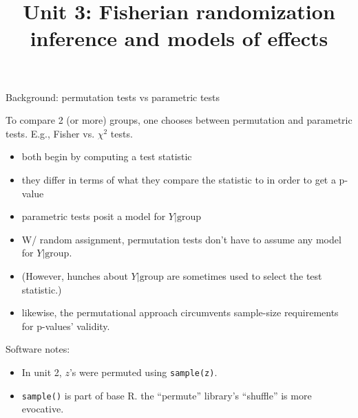 

%

%





\title[Fisherian inference]{Unit 3: Fisherian randomization inference and models of effects}




  


\begin{frame}[<+->]{Background: permutation tests vs parametric tests}

To compare 2 (or more) groups, one chooses between
permutation and parametric tests. E.g., Fisher vs. $\chi^{2}$ tests.
\begin{itemize}
\item both begin by computing a test statistic
\item they differ in terms of what they compare the statistic to in order to get a p-value
\item parametric tests posit a model for $Y| \mathrm{group}$
\item W/ random assignment, permutation tests don't have to
  assume any model for $Y| \mathrm{group}$.
\item (However, hunches about $Y| \mathrm{group}$ are sometimes used
  to select the test
  statistic.)
\item likewise, the permutational approach circumvents sample-size requirements for p-values' validity.
\end{itemize}

Software notes:
\begin{itemize}
\item In unit 2, $z$'s were permuted using \texttt{sample(z)}.
\item \texttt{sample()} is part of base R.  the ``permute'' library's
  ``\textrm{shuffle}''  is more evocative.
\end{itemize}

\end{frame}

